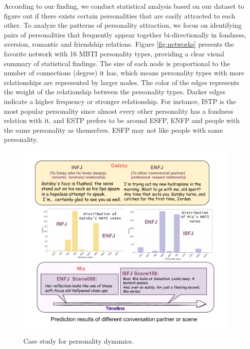 According to our finding, we conduct statistical analysis based on our dataset to figure out if there exists certain personalities that are easily attracted to each other. To analyze the patterns of personality attraction, we focus on identifying pairs of personalities that frequently appear together bi-directionally in fondness, aversion, romantic and friendship relations. Figure \ref{fig:networks} presents the favorite network with 16 MBTI personality types, providing a clear visual summary of statistical findings. The size of each node is proportional to the number of connections (degree) it has, which means personality types with more relationships are represented by larger nodes. The color of the edges represents the weight of the relationship between the personality types. Darker edges indicate a higher frequency or stronger relationship. 
For instance, ISTP is the most popular personality since almost every other personality has a fondness relation with it, and ESTP prefers to be around ESFP, ENFP and people with the same personality as themselves. ESFP may not like people with same personality.
\begin{figure}[ht]
    \centering
    \includegraphics[width=\linewidth, trim= 0 10 0 0, clip]{images/Dynamics.pdf}
    \caption{Case study for personality dynamics.}
    \label{fig:dynamics}
\end{figure}

